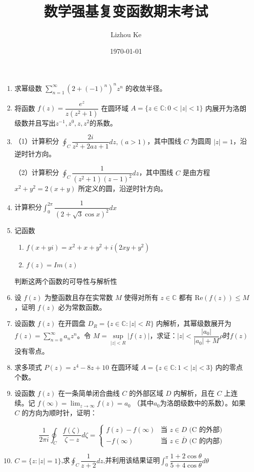\documentclass[12pt]{ctexart}
\title{\textbf{数学强基复变函数期末考试}}
\author{Lizhou Ke}
\date{\today}
\begin{document}
	\maketitle
	\thispagestyle{empty}

	\begin{enumerate}
		
		\item 
		求幂级数 $\sum\limits_{n=1}^{\infty}(2+(-1)^n)^nz^n$ 的收敛半径。
		
		\item 
		将函数 $f(z) = \dfrac{e^z}{z(z^2+1)}$ 在圆环域 $A = \{z \in \mathbb{C} : 0 < |z| < 1\}$ 内展开为洛朗级数并且写出$z^{-1} , z^0 , z , z^2$的系数。
		
		\item 
		（1）计算积分 $\oint_C \dfrac{2i}{z^2+2az+1} dz ,(a>1)$，其中围线 $C$ 为圆周 $|z|=1$，沿逆时针方向。
		
		 
		（2）计算积分 $\oint_C \dfrac{1}{(z^2+1)(z-1)^2} dz$，其中围线 $C$ 是由方程 $x^2+y^2=2(x+y)$ 所定义的圆，沿逆时针方向。
		
		\item 计算积分$\int_{0}^{2\pi}\dfrac{1}{(2+\sqrt{3}\cos x )^2}dx$
		
		\item 
		记函数
		\begin{enumerate}
			\item $f(x+yi)=x^2+x+y^2+i(2xy+y^2)$
			\item $f(z)=Im(z)$
		\end{enumerate}
		判断这两个函数的可导性与解析性
		
		\item 
		设 $f(z)$ 为整函数且存在实常数 $M$ 使得对所有 $z \in \mathbb{C}$ 都有 $\text{Re}(f(z)) \le M$，证明 $f(z)$ 必为常数函数。
		
		\item 
		设函数 $f(z)$ 在开圆盘 $D_R = \{z \in \mathbb{C} : |z|<R\}$ 内解析，其幂级数展开为 $f(z) = \sum\limits_{n=0}^{\infty} a_n z^n$。令 $M = \sup\limits_{|z|<R} |f(z)|$，求证：$|z|<\dfrac{|a_0|}{|a_0|+M}\rho $时$f(z)$没有零点。
		
		\item 
		求多项式 $P(z) = z^4 - 8z + 10$ 在圆环域 $A = \{z \in \mathbb{C} : 1 < |z| < 3\}$ 内的零点个数。
		
		\item 
		设函数 $f(z)$ 在一条简单闭合曲线 $C$ 的外部区域 $D$ 内解析，且在 $C$ 上连续。记 $f(\infty) = \lim_{z \to \infty} f(z)=a_0$ （其中$a_0$为洛朗级数中的系数）。如果 $C$ 的方向为顺时针，证明：
		
		\[
		\frac{1}{2\pi i} \oint_C \frac{f(\zeta)}{\zeta-z} d\zeta = 
		\begin{cases} 
			f(z) - f(\infty) & \text{当 } z \in D \text{ (C 的外部)} \\ 
			-f(\infty) & \text{当 } z \in \bar{D} \text{ (C 的内部)} 
		\end{cases}
		\]
		
		\item 
		$C=\{z:|z|=1\}$,求$\oint_C \dfrac{1}{z+2}dz$,并利用该结果证明$\int_0^{\pi}\dfrac{1+2\cos \theta}{5+4\cos \theta }d\theta$
		
	\end{enumerate}
	
\end{document}
